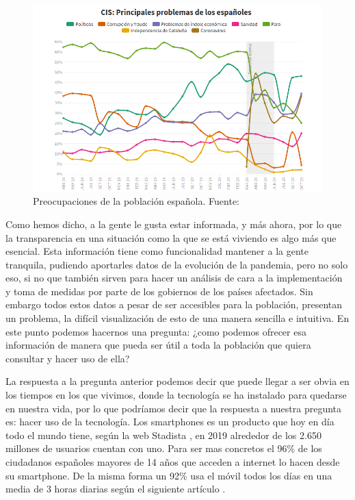 \begin{figure}[htb]
	\centering
	\includegraphics[width=1\textwidth]{img/preocupaciones}
	\caption{Preocupaciones de la población española. Fuente: \cite{rtve-preocupaciones}}
	\label{fig:preocupaciones}
\end{figure}

Como hemos dicho, a la gente le gusta estar informada, y más ahora, por lo que la transparencia en una situación como la que se está viviendo es algo más que esencial. Esta información tiene como funcionalidad mantener a la gente tranquila, pudiendo aportarles datos de la evolución de la pandemia, pero no solo eso, si no que también sirven para hacer un análisis de cara a la implementación y toma de medidas por parte de los gobiernos de los países afectados. Sin embargo todos estos datos a pesar de ser accesibles para la población, presentan un problema, la difícil visualización de esto de una manera sencilla e intuitiva. En este punto podemos hacernos una pregunta: ¿como podemos ofrecer esa información de manera que pueda ser útil a toda la población que quiera consultar y hacer uso de ella?

La respuesta a la pregunta anterior podemos decir que puede llegar a ser obvia en los tiempos en los que vivimos, donde la tecnología se ha instalado para quedarse en nuestra vida, por lo que podríamos decir que la respuesta a nuestra pregunta es: hacer uso de la tecnología. Los smartphones es un producto que hoy en día todo el mundo tiene, según la web Stadista \cite{statista}, en 2019 alrededor de los 2.650 millones de usuarios cuentan con uno. Para ser mas concretos el 96\% de los ciudadanos españoles mayores de 14 años que acceden a internet lo hacen desde su smartphone. De la misma forma un 92\% usa el móvil todos los días en una media de 3 horas diarias según el siguiente artículo \cite{elperiodico}.

